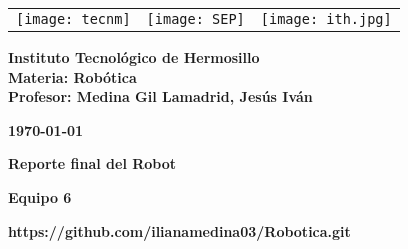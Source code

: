 \begin{titlepage}
	\centering
	\begin{tabular}{@{}p{} p{} p{}@{}}
		\texttt{[image: tecnm]} & 
		\centering \texttt{[image: SEP]} & 
		\raggedleft \texttt{[image: ith.jpg]} \\
	\end{tabular}
	
	\vspace{2em}
	
	\noindent
	\begin{minipage}[t]{0.6\textwidth}
		\raggedright
		\small \textbf{%
			Instituto Tecnológico de Hermosillo\\
			Materia: Robótica\\
			Profesor: Medina Gil Lamadrid, Jesús Iván%
		}
	\end{minipage}%
	\hfill
	\begin{minipage}[t]{0.3\textwidth}
		\raggedleft
		\small \textbf{\today}
	\end{minipage}
	
	\vspace{2em}
	
	{\Huge \textbf{Reporte final del Robot}}
		
	\vspace{1em}
	
	\begin{center}
		{\Large \textbf{Equipo 6}}
		
		{\small \textbf{https://github.com/ilianamedina03/Robotica.git}}
	\end{center}
	
	\vspace{1em}
	

\end{titlepage}
